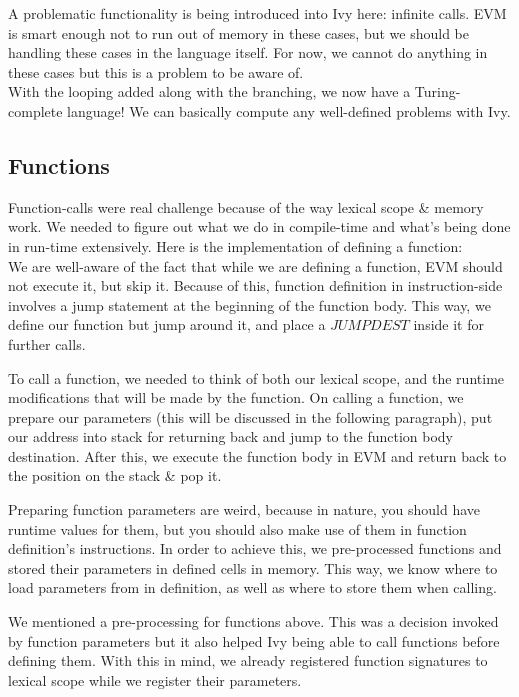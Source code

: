 \documentclass{article}
\begin{document}
A problematic functionality is being introduced into Ivy here: infinite calls. EVM is smart enough not to run out of memory in these cases, but we should be handling these cases in the language itself. For now, we cannot do anything in these cases but this is a problem to be aware of. \\

With the looping added along with the branching, we now have a Turing-complete language! We can basically compute any well-defined problems with Ivy.

\subsection{Functions}
Function-calls were real challenge because of the way lexical scope \& memory work. We needed to figure out what we do in compile-time and what's being done in run-time extensively. Here is the implementation of defining a function: \\

We are well-aware of the fact that while we are defining a function, EVM should not execute it, but skip it. Because of this, function definition in instruction-side involves a jump statement at the beginning of the function body. This way, we define our function but jump around it, and place a $JUMPDEST$ inside it for further calls.

To call a function, we needed to think of both our lexical scope, and the runtime modifications that will be made by the function. On calling a function, we prepare our parameters (this will be discussed in the following paragraph), put our address into stack for returning back and jump to the function body destination. After this, we execute the function body in EVM and return back to the position on the stack \& pop it.

Preparing function parameters are weird, because in nature, you should have runtime values for them, but you should also make use of them in function definition's instructions. In order to achieve this, we pre-processed functions and stored their parameters in defined cells in memory. This way, we know where to load parameters from in definition, as well as where to store them when calling.

We mentioned a pre-processing for functions above. This was a decision invoked by function parameters but it also helped Ivy being able to call functions before defining them. With this in mind, we already registered function signatures to lexical scope while we register their parameters.
\end{document}
